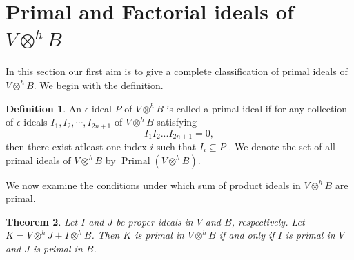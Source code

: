 \documentclass{birkjour}
\newtheorem{thm}{Theorem}[section]
\theoremstyle{definition}
\newtheorem{defn}[thm]{Definition}
\theoremstyle{remark}
\numberwithin{equation}{section}
\begin{document}
 










\section{Primal and Factorial ideals of $V \otimes^h B$}

In this section our first aim is to give a complete classification of primal ideals of $V \otimes^h B$. We begin with the definition. 



\begin{defn}
     An $\epsilon$-ideal $P$ of $V \otimes^h B$ is called a  primal ideal if for any collection of $\epsilon$-ideals $I_1, I_2, \cdots ,I_{2n+1}$  of $V \otimes^h B$ satisfying $$I_1 I_2...I_{2n+1}=0,$$ then there exist atleast one index $i$ such that $I_i \subseteq P$ . We denote the set of all primal ideals of $V \otimes^h B$  by $\operatorname{Primal}(V \otimes^h B)$.  


\end{defn}
    
 




We now examine the conditions under which sum of product ideals in $V \otimes^h B$ are  primal.



 








\begin{thm}\label{mainthmsec5}
    Let $I$ and $J$ be proper ideals in $V$ and $B$, respectively. Let $K=V \otimes^h J+ I \otimes^h B$. Then $K$ is primal in $V \otimes^h B$ if and only if $I$ is primal in $V$ and $J$ is primal in $B$.

     
    
    
    
    
    
    
   
\end{thm}
\end{document}
